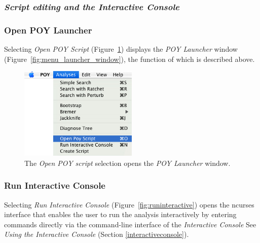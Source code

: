 {\subsubsection{\emph{Script editing and the Interactive Console}}

\subsubsection*{Open POY Launcher}

Selecting \emph{Open POY Script} (Figure~\ref{fig:open_poy_script}) displays the \emph{POY Launcher} 
window (Figure~\ref{fig:menu_launcher_window}), the function of which is described above.

\begin{figure}[htpb]
    \begin{center}
        \includegraphics[width=0.5\textwidth]{doc/figures/openpoyscript_menu.jpg}
    \end{center}
    \caption{The \emph{Open POY script} selection opens the \emph{POY Launcher} window.}
    \label{fig:open_poy_script}
\end{figure}

\subsubsection*{Run Interactive Console}

Selecting \emph{Run Interactive Console} (Figure~\ref{fig:runinteractive}) opens the ncurses interface
that enables the user to run the analysis interactively by entering \poy commands directly via the command-line interface of the \emph{Interactive Console} See \emph{Using the Interactive Console} (Section \ref{interactiveconsole}).

}
